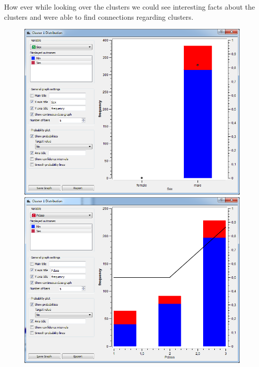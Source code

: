 \documentclass[a4paper,11pt]{article}
\begin{document}
How ever while looking over the clusters we could see interesting facts about the clusters and were able to find connections regarding clusters.

\begin{figure}[h]
	\centering
	\begin{center}
		\includegraphics[scale=0.30]{ClusterDistribution/Cluster1/Sex}
		\includegraphics[scale=0.30]{ClusterDistribution/Cluster1/PClass}\\
		\vspace{1 mm}

\end{center}
\end{figure}
\end{document}
